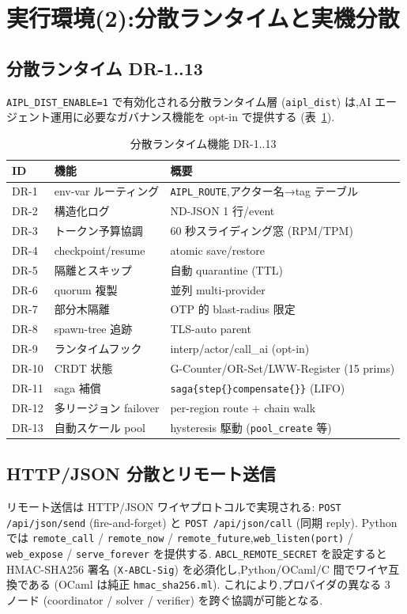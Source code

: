 \documentclass[11pt,a4paper]{article}
\newcommand{\code}[1]{\texttt{\small #1}}
\begin{document}
\section{実行環境(2):分散ランタイムと実機分散}\label{sec:dist}

\subsection{分散ランタイム DR-1..13}
\code{AIPL\_DIST\_ENABLE=1} で有効化される分散ランタイム層
(\code{aipl\_dist}) は,AI エージェント運用に必要なガバナンス機能を
opt-in で提供する (表~\ref{tab:dr}).

\begin{table}[h]
\centering\small
\caption{分散ランタイム機能 DR-1..13}\label{tab:dr}
\begin{tabularx}{\linewidth}{@{}l l X@{}}
\toprule
ID & 機能 & 概要 \\
\midrule
DR-1 & env-var ルーティング & \code{AIPL\_ROUTE},アクター名→tag テーブル \\
DR-2 & 構造化ログ & ND-JSON 1 行/event \\
DR-3 & トークン予算協調 & 60 秒スライディング窓 (RPM/TPM) \\
DR-4 & checkpoint/resume & atomic save/restore \\
DR-5 & 隔離とスキップ & 自動 quarantine (TTL) \\
DR-6 & quorum 複製 & 並列 multi-provider \\
DR-7 & 部分木隔離 & OTP 的 blast-radius 限定 \\
DR-8 & spawn-tree 追跡 & TLS-auto parent \\
DR-9 & ランタイムフック & interp/actor/call\_ai (opt-in) \\
DR-10 & CRDT 状態 & G-Counter/OR-Set/LWW-Register (15 prims) \\
DR-11 & saga 補償 & \code{saga\{step\{\}compensate\{\}\}} (LIFO) \\
DR-12 & 多リージョン failover & per-region route + chain walk \\
DR-13 & 自動スケール pool & hysteresis 駆動 (\code{pool\_create} 等) \\
\bottomrule
\end{tabularx}
\end{table}

\subsection{HTTP/JSON 分散とリモート送信}
リモート送信は HTTP/JSON ワイヤプロトコルで実現される:
\code{POST /api/json/send} (fire-and-forget) と
\code{POST /api/json/call} (同期 reply).
Python では \code{remote\_call} / \code{remote\_now} /
\code{remote\_future},\code{web\_listen(port)} /
\code{web\_expose} / \code{serve\_forever} を提供する.
\code{ABCL\_REMOTE\_SECRET} を設定すると HMAC-SHA256 署名
(\code{X-ABCL-Sig}) を必須化し,Python/OCaml/C 間でワイヤ互換である
(OCaml は純正 \code{hmac\_sha256.ml}).
これにより,プロバイダの異なる 3 ノード
(coordinator / solver / verifier) を跨ぐ協調が可能となる.
\end{document}

